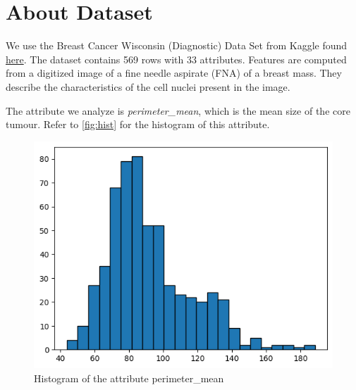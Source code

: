 \section{About Dataset}

We use the Breast Cancer Wisconsin (Diagnostic) Data Set from Kaggle found \href{https://www.kaggle.com/datasets/uciml/breast-cancer-wisconsin-data}{here}.
The dataset contains 569 rows with 33 attributes. Features are computed from a digitized image of a fine needle aspirate (FNA) of a breast mass.
They describe the characteristics of the cell nuclei present in the image.

The attribute we analyze is \textit{perimeter\_mean}, which is the mean size of the core tumour.
Refer to \autoref{fig:hist} for the histogram of this attribute.

\begin{figure}[!ht]
  \centering
  \includegraphics[width=.6\textwidth]{images/data-hist.png}
  \caption{Histogram of the attribute perimeter\_mean}
  \label{fig:hist}
\end{figure}
